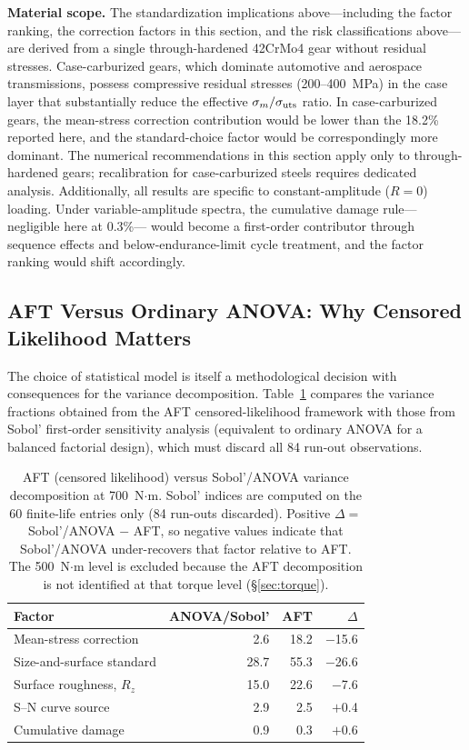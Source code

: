 \documentclass[twocolumn,12pt,a4paper]{article}
\begin{document}
\textbf{Material scope.} The standardization implications
above---including the factor ranking, the correction factors in
this section, and the risk classifications
above---are derived from a single through-hardened
42CrMo4 gear without residual stresses. Case-carburized gears, which
dominate automotive and aerospace transmissions, possess compressive
residual stresses (200--400~MPa) in the case layer that substantially
reduce the effective $\sigma_m/\sigma_{\rm uts}$ ratio. In
case-carburized gears, the mean-stress correction contribution would
be lower than the 18.2\% reported here, and the standard-choice
factor would be correspondingly more dominant. The numerical recommendations in this section apply only to
through-hardened gears; recalibration for case-carburized steels
requires dedicated analysis. Additionally, all results are specific
to constant-amplitude ($R=0$) loading. Under variable-amplitude
spectra, the cumulative damage rule---negligible here at 0.3\%---%
would become a first-order contributor through sequence effects and
below-endurance-limit cycle treatment, and the factor ranking would
shift accordingly.

\subsection{AFT Versus Ordinary ANOVA: Why Censored Likelihood Matters}
\label{sec:aft_vs_anova}

The choice of statistical model is itself a methodological decision
with consequences for the variance decomposition. Table~\ref{tab:aft_vs_anova}
compares the variance fractions obtained from the AFT censored-likelihood
framework with those from Sobol' first-order sensitivity analysis
(equivalent to ordinary ANOVA for a balanced factorial design), which
must discard all 84 run-out observations.

\begin{table}[ht]
\centering
\caption{AFT (censored likelihood) versus Sobol'/ANOVA variance
decomposition at 700~N$\cdot$m. Sobol' indices are computed on the
60 finite-life entries only (84 run-outs discarded). Positive
$\Delta = $ Sobol'/ANOVA $-$ AFT, so negative values indicate that
Sobol'/ANOVA under-recovers that factor relative to AFT. The
500~N$\cdot$m level is excluded because the AFT decomposition is not
identified at that torque level (\S\ref{sec:torque}).\label{tab:aft_vs_anova}}
\footnotesize
\begin{tabular}{lrrr}
\toprule
Factor & ANOVA/Sobol' & AFT & $\Delta$ \\
\midrule
Mean-stress correction & 2.6 & 18.2 & $-$15.6 \\
Size-and-surface standard & 28.7 & 55.3 & $-$26.6 \\
Surface roughness, $R_z$ & 15.0 & 22.6 & $-$7.6 \\
S--N curve source & 2.9 & 2.5 & $+$0.4 \\
Cumulative damage & 0.9 & 0.3 & $+$0.6 \\
\bottomrule
\end{tabular}
\end{table}
\end{document}
